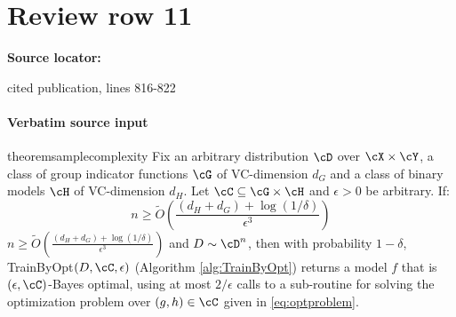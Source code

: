 \documentclass[10pt]{article}
\begin{document}
\section*{Review row 11}
\textbf{Source locator:} {\footnotesize\raggedright cited publication, lines 816-\allowbreak{}822\par}
\paragraph{Verbatim source input}
\begin{ReviewVerbatim}
\begin{restatable}{theorem}{samplecomplexity}
Fix an arbitrary distribution $\cD$ over $\cX\times \cY$, a class of group indicator functions $\cG$ of VC-dimension $d_G$ and a class of binary models $\cH$ of VC-dimension $d_H$. Let $\cC \subseteq \cG \times \cH$ and $\epsilon > 0$ be arbitrary.  If: \ifdraft
$$n \geq \tilde O\left(\frac{(d_H + d_G) + \log(1/\delta)}{\epsilon^3} \right)$$
\else $n \geq \tilde O\left(\frac{(d_H + d_G) + \log(1/\delta)}{\epsilon^3} \right)$ \fi
and $D \sim \cD^n$,
then with probability $1-\delta$,  TrainByOpt$(D,\cC,\epsilon)$ (Algorithm \ref{alg:TrainByOpt}) returns a model $f$ that is $(\epsilon,\cC)$-Bayes optimal, using at most $2/\epsilon$ calls to a sub-routine for solving the optimization problem over $(g,h) \in \cC$ given in \eqref{eq:optproblem}.
\end{restatable}
\end{ReviewVerbatim}
\end{document}
